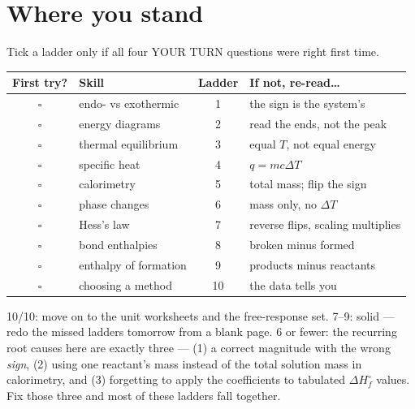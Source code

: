 \documentclass{apchem-worksheet}
\begin{document}
\section*{\sffamily Where you stand}

Tick a ladder only if all four YOUR TURN questions were right first time.

\renewcommand{\arraystretch}{1.30}
\noindent\begin{tabular}{@{}c p{6.0cm} c >{\raggedright\arraybackslash}p{4.9cm}@{}}
\toprule
\textbf{First try?} & \textbf{Skill} & \textbf{Ladder} &
  \textbf{If not, re-read\ldots}\\
\midrule
$\square$ & endo- vs exothermic & 1 & the sign is the system's \\
$\square$ & energy diagrams & 2 & read the ends, not the peak \\
$\square$ & thermal equilibrium & 3 & equal $T$, not equal energy \\
$\square$ & specific heat & 4 & $q = mc\Delta T$ \\
$\square$ & calorimetry & 5 & total mass; flip the sign \\
$\square$ & phase changes & 6 & mass only, no $\Delta T$ \\
$\square$ & Hess's law & 7 & reverse flips, scaling multiplies \\
$\square$ & bond enthalpies & 8 & broken minus formed \\
$\square$ & enthalpy of formation & 9 & products minus reactants \\
$\square$ & choosing a method & 10 & the data tells you \\
\bottomrule
\end{tabular}

\begin{apcnote}
10/10: move on to the unit worksheets and the free-response set.
7--9: solid --- redo the missed ladders tomorrow from a blank page.
6 or fewer: the recurring root causes here are exactly three ---
(1) a correct magnitude with the wrong \emph{sign}, (2) using one
reactant's mass instead of the total solution mass in calorimetry, and
(3) forgetting to apply the coefficients to tabulated
$\Delta H_f^\circ$ values. Fix those three and most of these ladders fall
together.
\end{apcnote}
\end{document}
